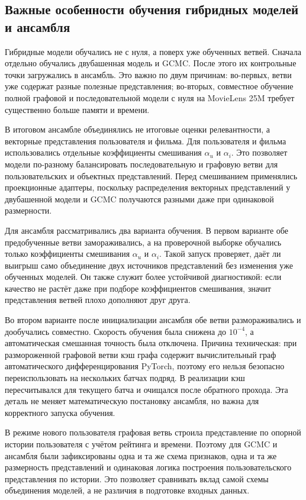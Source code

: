 \documentclass[12pt,fleqn]{article}
\begin{document}
\subsection{Важные особенности обучения гибридных моделей и ансамбля}

Гибридные модели обучались не с нуля, а поверх уже обученных ветвей. Сначала
отдельно обучались двубашенная модель и GCMC. После этого их контрольные точки
загружались в ансамбль. Это важно по двум причинам: во-первых, ветви уже
содержат разные полезные представления; во-вторых, совместное обучение полной
графовой и последовательной модели с нуля на MovieLens 25M требует существенно
больше памяти и времени.

В итоговом ансамбле объединялись не итоговые оценки релевантности, а векторные
представления пользователя и фильма. Для пользователя и фильма использовались
отдельные коэффициенты смешивания $\alpha_u$ и $\alpha_i$. Это позволяет модели
по-разному балансировать последовательную и графовую ветви для пользовательских
и объектных представлений. Перед смешиванием применялись проекционные адаптеры,
поскольку распределения векторных представлений у двубашенной модели и GCMC
получаются разными даже при одинаковой размерности.

Для ансамбля рассматривались два варианта обучения. В первом варианте обе
предобученные ветви замораживались, а на проверочной выборке обучались только
коэффициенты смешивания $\alpha_u$ и $\alpha_i$. Такой запуск проверяет, даёт ли
выигрыш само объединение двух источников представлений без изменения уже
обученных моделей. Он также служит более устойчивой диагностикой: если качество
не растёт даже при подборе коэффициентов смешивания, значит представления ветвей
плохо дополняют друг друга.

Во втором варианте после инициализации ансамбля обе ветви размораживались и
дообучались совместно. Скорость обучения была снижена до $10^{-4}$, а
автоматическая смешанная точность была отключена. Причина техническая: при
размороженной графовой ветви кэш графа содержит вычислительный граф
автоматического дифференцирования PyTorch, поэтому его нельзя безопасно
переиспользовать на нескольких батчах подряд. В реализации кэш пересчитывался
для текущего батча и очищался после обратного прохода. Эта деталь не меняет
математическую постановку ансамбля, но важна для корректного запуска обучения.

В режиме нового пользователя графовая ветвь строила представление по опорной
истории пользователя с учётом рейтинга и времени. Поэтому для GCMC и ансамбля
были зафиксированы одна и та же схема признаков, одна и та же размерность
представлений и одинаковая логика построения пользовательского представления по
истории. Это позволяет сравнивать вклад самой схемы объединения моделей, а не
различия в подготовке входных данных.
\end{document}
